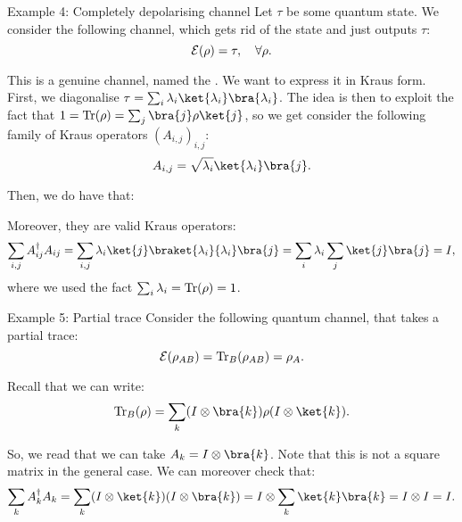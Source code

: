 \documentclass[a4paper]{article}
\begin{document}
\begin{parag}{Example 4: Completely depolarising channel}
    Let $\tau$ be some quantum state. We consider the following channel, which gets rid of the state and just outputs $\tau$: 
    \[\mathcal{E}\left(\rho\right) = \tau, \mathspace \forall \rho.\]

    This is a genuine channel, named the . We want to express it in Kraus form. First, we diagonalise $\tau = \sum_{i} \lambda_i \ket{\lambda_i}\bra{\lambda_i}$. The idea is then to exploit the fact that $1 = \Tr\left(\rho\right) = \sum_{j} \bra{j} \rho \ket{j}$, so we get consider the following family of Kraus operators $\left(A_{i, j}\right)_{i, j}$: 
    \[A_{i,j} = \sqrt{\lambda_i} \ket{\lambda_i}\bra{j}.\]
    
    Then, we do have that: 

    Moreover, they are valid Kraus operators: 
    \[\sum_{i, j} A_{ij}^{\dagger} A_{ij} = \sum_{i, j} \lambda_i \ket{j} \braket{\lambda_i}{\lambda_i} \bra{j} = \sum_{i} \lambda_i \sum_{j} \ket{j}\bra{j} = I,\]
    where we used the fact $\sum_{i} \lambda_i = \Tr\left(\rho\right) = 1$.
\end{parag}

\begin{parag}{Example 5: Partial trace}
    Consider the following quantum channel, that takes a partial trace: 
    \[\mathcal{E}\left(\rho_{AB}\right) = \Tr_B\left(\rho_{AB}\right) = \rho_A.\]
    
    Recall that we can write: 
    \[\Tr_B\left(\rho\right) = \sum_{k} \left(I \otimes \bra{k}\right) \rho \left(I \otimes \ket{k}\right).\]

    So, we read that we can take $A_k = I \otimes \bra{k}$. Note that this is not a square matrix in the general case. We can moreover check that: 
    \[\sum_{k} A_k^{\dagger} A_k = \sum_{k} \left(I \otimes \ket{k}\right)\left(I \otimes \bra{k}\right) = I \otimes \sum_{k} \ket{k}\bra{k} = I \otimes I = I.\]
\end{parag}
\end{document}
